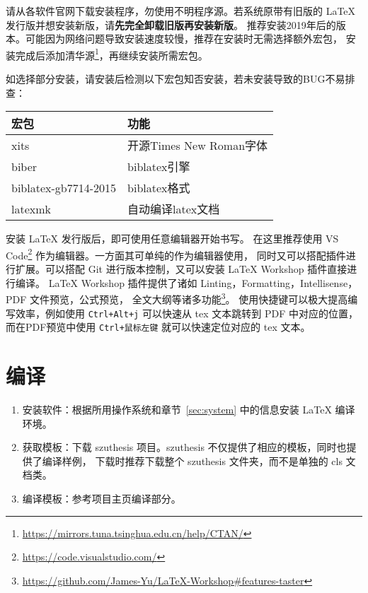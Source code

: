请从各软件官网下载安装程序，勿使用不明程序源。若系统原带有旧版的 \LaTeX{} 发行版并想安装新版，请\textbf{先完全卸载旧版再安装新版}。
推荐安装2019年后的版本。可能因为网络问题导致安装速度较慢，推荐在安装时无需选择额外宏包，
安装完成后添加清华源\footnote{\url{https://mirrors.tuna.tsinghua.edu.cn/help/CTAN/}}，再继续安装所需宏包。

如选择部分安装，请安装后检测以下宏包知否安装，若未安装导致的BUG不易排查：

\begin{center}
    \renewcommand{\arraystretch}{0.8}%
    \begin{tabular}{ll}
        \toprule
        宏包                 & 功能                    \\
        \midrule
        xits                 & 开源Times New Roman字体 \\
        biber                & biblatex引擎            \\
        biblatex-gb7714-2015 & biblatex格式            \\
        latexmk              & 自动编译latex文档       \\
        \bottomrule
    \end{tabular}
\end{center}

安装 \LaTeX{} 发行版后，即可使用任意编辑器开始书写。
在这里推荐使用 VS Code\footnote{\url{https://code.visualstudio.com/}} 作为编辑器。一方面其可单纯的作为编辑器使用，
同时又可以搭配插件进行扩展。可以搭配 Git 进行版本控制，又可以安装 LaTeX Workshop 插件直接进行编译。
LaTeX Workshop 插件提供了诸如 Linting，Formatting，Intellisense，PDF 文件预览，公式预览，
全文大纲等诸多功能\footnote{\url{https://github.com/James-Yu/LaTeX-Workshop\#features-taster}}。
使用快捷键可以极大提高编写效率，例如使用 \lstinline!Ctrl+Alt+j! 可以快速从 tex 文本跳转到 PDF 中对应的位置，
而在PDF预览中使用 \lstinline!Ctrl+鼠标左键! 就可以快速定位对应的 tex 文本。


\section{编译}

\begin{enumerate}[wide=\parindent]
    \item 安装软件：根据所用操作系统和章节~\ref{sec:system} 中的信息安装 \LaTeX{} 编译环境。

    \item 获取模板：下载 szuthesis 项目。szuthesis 不仅提供了相应的模板，同时也提供了编译样例，
          下载时推荐下载整个 szuthesis 文件夹，而不是单独的 cls 文档类。

    \item 编译模板：参考项目主页编译部分。
\end{enumerate}


